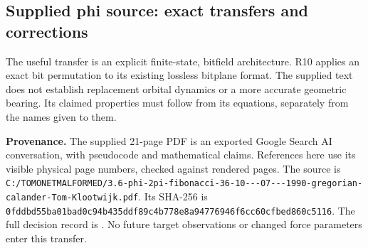 \subsection{Supplied phi source: exact transfers and corrections}
\label{sec:phi-source-audit}

The useful transfer is an explicit finite-state, bitfield architecture.
R10 applies an exact bit permutation to its existing lossless bitplane format.
The supplied text does not establish replacement orbital dynamics or a more
accurate geometric bearing. Its claimed properties must follow from its
equations, separately from the names given to them.

\textbf{Provenance.} The supplied 21-page PDF is an exported Google Search AI
conversation, with pseudocode and mathematical claims. References here use its
visible physical page numbers, checked against rendered pages. The source is
\nolinkurl{C:/TOMONETMALFORMED/3.6-phi-2pi-fibonacci-36-10---07---1990-gregorian-calander-Tom-Klootwijk.pdf}.
Its SHA-256 is
\nolinkurl{0fddbd55ba01bad0c94b435ddf89c4b778e8a94776946f6cc60cfbed860c5116}.
The full decision record is .
No future target observations or changed force parameters enter this transfer.

